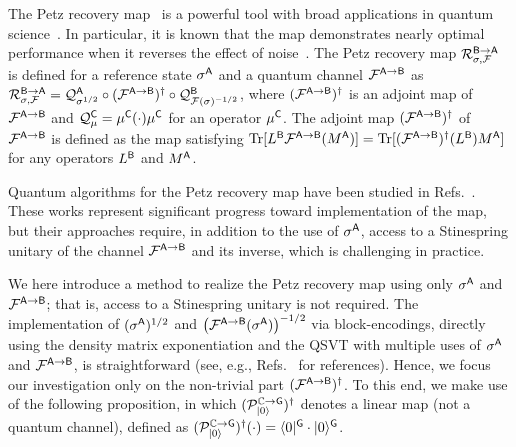




The Petz recovery map~\cite{petz1986sufficient, petz1988sufficiency} is a powerful tool with broad applications in quantum science~\cite{barnum2002reversing, ng2010simpleapproach, beigi2016decoding, chen2020entanglement, lauten2022approx, nakayama2023petz}.
In particular, it is known that the map demonstrates nearly optimal performance when it reverses the effect of noise~\cite{barnum2002reversing, beigi2016decoding}.
The Petz recovery map ${\mathcal{R}}_{\sigma, {\mathcal{F}}}^{{\mathsf{B}} \rightarrow {\mathsf{A}}}$ is defined for a reference state $\sigma^{\mathsf{A}}$ and a quantum channel ${\mathcal{F}}^{{\mathsf{A}}\rightarrow{\mathsf{B}}}$ as ${\mathcal{R}}_{\sigma, {\mathcal{F}}}^{{\mathsf{B}} \rightarrow {\mathsf{A}}} = {\mathcal{Q}}_{\sigma^{1/2}}^{\mathsf{A}}\circ({\mathcal{F}}^{{\mathsf{A}}\rightarrow{\mathsf{B}}})^\dag\circ{\mathcal{Q}}_{{\mathcal{F}}(\sigma)^{-1/2}}^{\mathsf{B}}$, where $({\mathcal{F}}^{{\mathsf{A}}\rightarrow{\mathsf{B}}})^\dag$ is an adjoint map of ${\mathcal{F}}^{{\mathsf{A}}\rightarrow{\mathsf{B}}}$ and ${\mathcal{Q}}_{\mu}^{\mathsf{C}} = \mu^{\mathsf{C}}(\cdot)\mu^{\mathsf{C}}$ for an operator $\mu^{\mathsf{C}}$.
The adjoint map $({\mathcal{F}}^{{\mathsf{A}}\rightarrow{\mathsf{B}}})^\dag$ of ${\mathcal{F}}^{{\mathsf{A}}\rightarrow{\mathsf{B}}}$ is defined as the map satisfying $\operatorname{Tr}[L^{\mathsf{B}}{\mathcal{F}}^{{\mathsf{A}}\rightarrow{\mathsf{B}}}(M^{\mathsf{A}})]=\operatorname{Tr}[({\mathcal{F}}^{{\mathsf{A}}\rightarrow{\mathsf{B}}})^\dag(L^{\mathsf{B}})M^{\mathsf{A}}]$ for any operators $L^{\mathsf{B}}$ and $M^{\mathsf{A}}$.


Quantum algorithms for the Petz recovery map have been studied in Refs.~\cite{gilyen2022petzmap, biswas2023noiseadapted}.
These works represent significant progress toward implementation of the map, but their approaches require, in addition to the use of $\sigma^{\mathsf{A}}$, access to a Stinespring unitary of the channel ${\mathcal{F}}^{{\mathsf{A}}\rightarrow{\mathsf{B}}}$ and its inverse, which is challenging in practice.


We here introduce a method to realize the Petz recovery map using only $\sigma^{{\mathsf{A}}}$ and ${\mathcal{F}}^{{\mathsf{A}}\rightarrow{\mathsf{B}}}$; that is, access to a Stinespring unitary is not required.
The implementation of $(\sigma^{{\mathsf{A}}})^{1/2}$ and $\big({\mathcal{F}}^{{\mathsf{A}} \rightarrow {\mathsf{B}}}(\sigma^{\mathsf{A}})\big)^{-1/2}$ via block-encodings, directly using the density matrix exponentiation and the QSVT with multiple uses of $\sigma^{{\mathsf{A}}}$ and ${\mathcal{F}}^{{\mathsf{A}} \rightarrow {\mathsf{B}}}$, is straightforward (see, e.g., Refs.~\cite{gilyen2022petzmap, gilyen2022improvedfidelity, wang2023SampletoQuary, wang2024TimeEfficientEntEstSamp} for references).
Hence, we focus our investigation only on the non-trivial part $({\mathcal{F}}^{{\mathsf{A}}\rightarrow{\mathsf{B}}})^\dag$.
To this end, we make use of the following proposition, in which $({\mathcal{P}}_{|0\rangle}^{\mathbb{C}\rightarrow{\mathsf{G}}})^\dag$ denotes a linear map (not a quantum channel), defined as $({\mathcal{P}}_{|0\rangle}^{\mathbb{C}\rightarrow{\mathsf{G}}})^\dag(\cdot) = \langle0|^{\mathsf{G}} \cdot |0\rangle^{\mathsf{G}}$.





